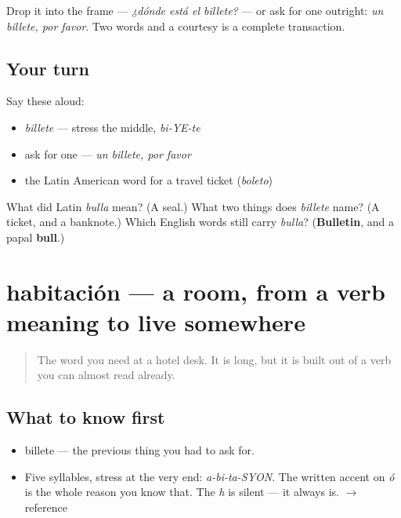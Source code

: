 \begin{grammarlens}[title={What you've built}]
Drop it into the frame — \emph{¿dónde está el billete?} — or ask for one outright: \emph{un billete, por favor}. Two words and a courtesy is a complete transaction.
\end{grammarlens}

\subsection*{Your turn}
Say these aloud:

\begin{itemize}
\raggedright
  \item \emph{billete} — stress the middle, \emph{bi-YE-te}
  \item ask for one — \emph{un billete, por favor}
  \item the Latin American word for a travel ticket (\emph{boleto})
\end{itemize}

\begin{tcolorbox}[breakable,colback=teal!4,colframe=teal!35!black,title={Before you move on}]
What did Latin \emph{bulla} mean? (A seal.) What two things does \emph{billete} name? (A ticket, and a banknote.) Which English words still carry \emph{bulla}? (\textbf{Bulletin}, and a papal \textbf{bull}.)
\end{tcolorbox}
\section[habitación]{habitación — a room, from a verb meaning to live somewhere}

\label{lesson:ES-C268-habitacion}



\begin{quote}
The word you need at a hotel desk. It is long, but it is built out of a verb you can almost read already.
\end{quote}

\subsection*{What to know first}
\begin{itemize}
\raggedright
  \item billete — the previous thing you had to ask for.
\end{itemize}

\begin{sounds}
\begin{itemize}
\raggedright
  \item Five syllables, stress at the very end: \emph{a-bi-ta-SYON}. The written accent on \emph{ó} is the whole reason you know that. The \emph{h} is silent — it always is. $\to$ reference
\end{itemize}
\end{sounds}

